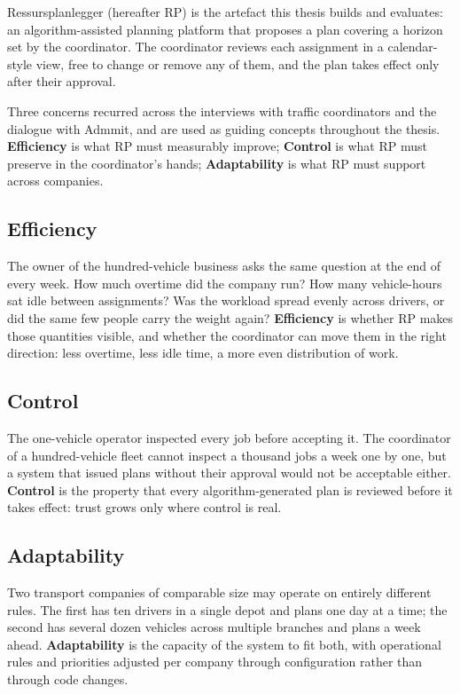 Ressursplanlegger (hereafter RP) is the artefact this thesis builds and evaluates: an algorithm-assisted planning platform that proposes a plan covering a horizon set by the coordinator. The coordinator reviews each assignment in a calendar-style view, free to change or remove any of them, and the plan takes effect only after their approval.

Three concerns recurred across the interviews with traffic coordinators and the dialogue with Admmit, and are used as guiding concepts throughout the thesis. \textbf{Efficiency} is what RP must measurably improve; \textbf{Control} is what RP must preserve in the coordinator's hands; \textbf{Adaptability} is what RP must support across companies.

\subsection{Efficiency}
\label{sec:anchor-efficiency}

The owner of the hundred-vehicle business asks the same question at the end of every week. How much overtime did the company run? How many vehicle-hours sat idle between assignments? Was the workload spread evenly across drivers, or did the same few people carry the weight again? \textbf{Efficiency} is whether RP makes those quantities visible, and whether the coordinator can move them in the right direction: less overtime, less idle time, a more even distribution of work.

\subsection{Control}
\label{sec:anchor-trust-control}

The one-vehicle operator inspected every job before accepting it. The coordinator of a hundred-vehicle fleet cannot inspect a thousand jobs a week one by one, but a system that issued plans without their approval would not be acceptable either. \textbf{Control} is the property that every algorithm-generated plan is reviewed before it takes effect: trust grows only where control is real.

\subsection{Adaptability}
\label{sec:anchor-adaptability}

Two transport companies of comparable size may operate on entirely different rules. The first has ten drivers in a single depot and plans one day at a time; the second has several dozen vehicles across multiple branches and plans a week ahead. \textbf{Adaptability} is the capacity of the system to fit both, with operational rules and priorities adjusted per company through configuration rather than through code changes.


